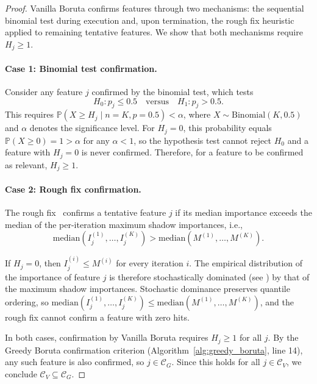 \documentclass[runningheads]{llncs}
\begin{document}
\begin{proof}
Vanilla Boruta confirms features through two mechanisms: the sequential binomial test during execution and, upon termination, the rough fix heuristic applied to remaining tentative features. We show that both mechanisms require $H_j \geq 1$.


\paragraph{Case 1: Binomial test confirmation.}
Consider any feature $j$ confirmed by the binomial test, which tests 
$$
H_0 : p_j \leq 0.5
\quad \text{versus} \quad
H_1 : p_j > 0.5.
$$
This requires $\mathbb{P}(X \geq H_j \mid n = K, p = 0.5) < \alpha$, where $X \sim \text{Binomial}(K, 0.5)$ and $\alpha$ denotes the significance level. For $H_j = 0$, this probability equals $\mathbb{P}(X \geq 0) = 1 > \alpha$ for any $\alpha < 1$, so the hypothesis test cannot reject $H_0$ and a feature with $H_j = 0$ is never confirmed. Therefore, for a feature to be confirmed as relevant, $H_j \geq 1$.

\paragraph{Case 2: Rough fix confirmation.}
The rough fix~\cite{kursa2010feature} confirms a tentative feature $j$ if its median importance exceeds the median of the per-iteration maximum shadow importances, i.e., 
$$\mathrm{median}(I_j^{(1)}, \ldots, I_j^{(K)}) > \mathrm{median}(M^{(1)}, \ldots, M^{(K)}).$$


If $H_j = 0$, then $I_j^{(i)} \leq M^{(i)}$ for every iteration $i$. The empirical distribution of the importance of feature $j$ is therefore stochastically dominated (see \cite{levy1990stochastic,blackwell1953equivalent}) by that of the maximum shadow importances. Stochastic dominance preserves quantile ordering, so $\mathrm{median}(I_j^{(1)}, \ldots, I_j^{(K)}) \leq \mathrm{median}(M^{(1)}, \ldots, M^{(K)})$, and the rough fix cannot confirm a feature with zero hits.

In both cases, confirmation by Vanilla Boruta requires $H_j \geq 1$ for all $j$. By the Greedy Boruta confirmation criterion (Algorithm~\ref{alg:greedy_boruta}, line 14), any such feature is also confirmed, so $j \in \mathcal{C}_G$. Since this holds for all $j \in \mathcal{C}_V$, we conclude $\mathcal{C}_V \subseteq \mathcal{C}_G$. 
\end{proof}
\end{document}
